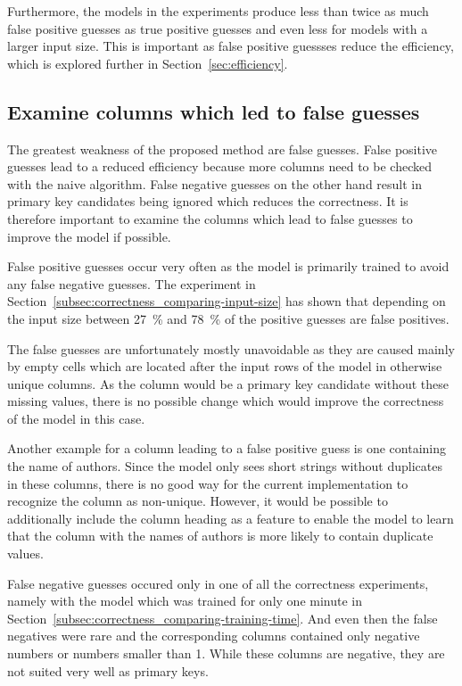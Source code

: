 Furthermore, the models in the experiments produce less than twice as much false positive guesses as true positive guesses and even less for models with a larger input size. This is important as false positive guessses reduce the efficiency, which is explored further in Section~\ref{sec:efficiency}.


\subsection{Examine columns which led to false guesses}\label{subsec:correctness_examine-false-guesses} %
The greatest weakness of the proposed method are false guesses. False positive guesses lead to a reduced efficiency because more columns need to be checked with the naive algorithm. False negative guesses on the other hand result in primary key candidates being ignored which reduces the correctness. It is therefore important to examine the columns which lead to false guesses to improve the model if possible.

False positive guesses occur very often as the model is primarily trained to avoid any false negative guesses. The experiment in Section~\ref{subsec:correctness_comparing-input-size} has shown that depending on the input size between \SI{27}{\percent} and \SI{78}{\percent} of the positive guesses are false positives.

The false guesses are unfortunately mostly unavoidable as they are caused mainly by empty cells which are located after the input rows of the model in otherwise unique columns. As the column would be a primary key candidate without these missing values, there is no possible change which would improve the correctness of the model in this case.

Another example for a column leading to a false positive guess is one containing the name of authors. Since the model only sees short strings without duplicates in these columns, there is no good way for the current implementation to recognize the column as non-unique. However, it would be possible to additionally include the column heading as a feature to enable the model to learn that the column with the names of authors is more likely to contain duplicate values.

False negative guesses occured only in one of all the correctness experiments, namely with the model which was trained for only one minute in Section~\ref{subsec:correctness_comparing-training-time}. And even then the false negatives were rare and the corresponding columns contained only negative numbers or numbers smaller than 1. While these columns are negative, they are not suited very well as primary keys. %

